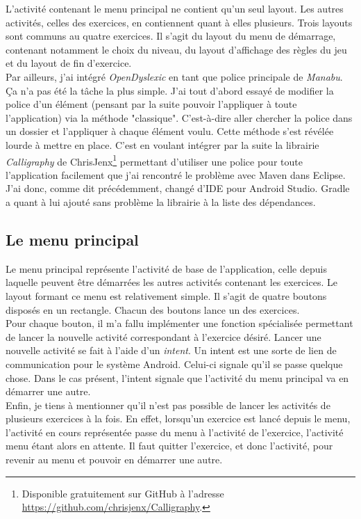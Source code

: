 L'activité contenant le menu principal ne contient qu'un seul layout. Les autres activités, celles des exercices, en contiennent quant à elles plusieurs. Trois layouts sont communs au quatre exercices. Il s'agit du layout du menu de démarrage, contenant notamment le choix du niveau, du layout d'affichage des règles du jeu et du layout de fin d'exercice.\\

Par ailleurs, j'ai intégré \textit{OpenDyslexic} en tant que police principale de \textit{Manabu}. Ça n'a pas été la tâche la plus simple. J'ai tout d'abord essayé de modifier la police d'un élément (pensant par la suite pouvoir l'appliquer à toute l'application) via la méthode "classique". C'est-à-dire aller chercher la police dans un dossier et l'appliquer à chaque élément voulu. Cette méthode s'est révélée lourde à mettre en place. C'est en voulant intégrer par la suite la librairie \textit{Calligraphy} de ChrisJenx\footnote{Disponible gratuitement sur GitHub à l'adresse \url{https://github.com/chrisjenx/Calligraphy}.} permettant d'utiliser une police pour toute l'application facilement que j'ai rencontré le problème avec Maven dans Eclipse. J'ai donc, comme dit précédemment, changé d'IDE pour Android Studio. Gradle a quant à lui ajouté sans problème la librairie à la liste des dépendances.

\subsection{Le menu principal}
Le menu principal représente l'activité de base de l'application, celle depuis laquelle peuvent être démarrées les autres activités contenant les exercices. Le layout formant ce menu est relativement simple. Il s'agit de quatre boutons disposés en un rectangle. Chacun des boutons lance un des exercices.\\

Pour chaque bouton, il m'a fallu implémenter une fonction spécialisée permettant de lancer la nouvelle activité correspondant à l'exercice désiré.
Lancer une nouvelle activité se fait à l'aide d'un \textit{intent}. Un intent est une sorte de lien de communication pour le système Android. Celui-ci signale qu'il se passe quelque chose. Dans le cas présent, l'intent signale que l'activité du menu principal va en démarrer une autre.\\

Enfin, je tiens à mentionner qu'il n'est pas possible de lancer les activités de plusieurs exercices à la fois. En effet, lorsqu'un exercice est lancé depuis le menu, l'activité en cours représentée passe du menu à l'activité de l'exercice, l'activité menu étant alors en attente. Il faut quitter l'exercice, et donc l'activité, pour revenir au menu et pouvoir en démarrer une autre.

